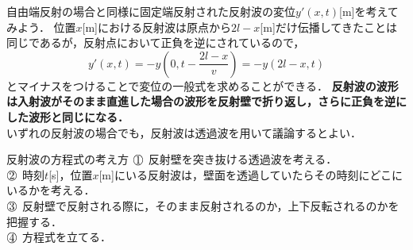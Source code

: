 自由端反射の場合と同様に固定端反射された反射波の変位$y'(x,t)$[m]を考えてみよう．
位置$x$[m]における反射波は原点から$2l-x$[m]だけ伝播してきたことは同じであるが，反射点において正負を逆にされているので，
\[y'(x,t)=-y\left( 0,t-\dfrac{2l-x}{v} \right) =-y(2l-x,t)\]
とマイナスをつけることで変位の一般式を求めることができる．
{\bf 反射波の波形は入射波がそのまま直進した場合の波形を反射壁で折り返し，さらに正負を逆にした波形と同じになる．}\\

いずれの反射波の場合でも，反射波は透過波を用いて議論するとよい．

\begin{matome}{反射波の方程式の考え方}
 \hspace{3mm} $\MARU{1}$\hspace{2mm} 反射壁を突き抜ける透過波を考える．\\
 \hspace{3mm} $\MARU{2}$\hspace{2mm} 時刻$t$[s]，位置$x$[m]にいる反射波は，壁面を透過していたらその時刻にどこにいるかを考える．\\
 \hspace{3mm} $\MARU{3}$\hspace{2mm} 反射壁で反射される際に，そのまま反射されるのか，上下反転されるのかを把握する．\\
 \hspace{3mm} $\MARU{4}$\hspace{2mm} 方程式を立てる．
 \end{matome}

